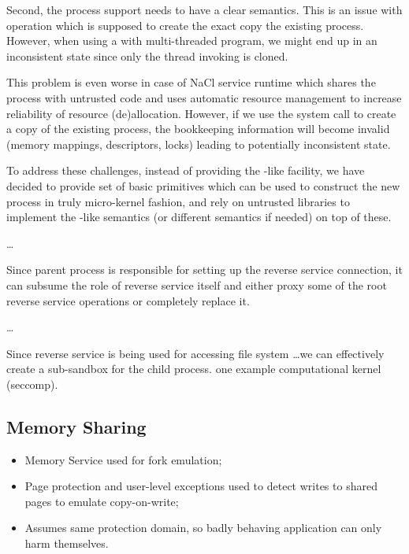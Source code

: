 Second, the process support needs to have a clear semantics. This is an
issue with  operation which is supposed to create the
exact copy the existing process. However, when using a 
with multi-threaded program, we might end up in an inconsistent state
since only the thread invoking  is cloned.

This problem is even worse in case of NaCl service runtime which shares
the process with untrusted code and uses automatic resource management
to increase reliability of resource (de)allocation. However, if we use
the  system call to create a copy of the existing process,
the bookkeeping information will become invalid (\eg memory mappings,
descriptors, locks) leading to potentially inconsistent state.

To address these challenges, instead of providing the
-like facility, we have decided to provide set of basic
primitives which can be used to construct the new process in truly
micro-kernel fashion, and rely on untrusted libraries to implement the
-like semantics (\eg or different semantics if needed) on
top of these.

\ldots

Since parent process is responsible for setting up the reverse service
connection, it can subsume the role of reverse service itself and either
proxy some of the root reverse service operations or completely replace
it.

\ldots

Since reverse service is being used for accessing file system \ldots we
can effectively create a sub-sandbox for the child process. one example
computational kernel (seccomp).

\subsection{Memory Sharing}
\label{sub:memory_sharing}

\begin{itemize}
\item Memory Service used for fork emulation;
\item Page protection and user-level exceptions used to detect
  writes to shared pages to emulate copy-on-write;
\item Assumes same protection domain, so badly behaving application
  can only harm themselves.
\end{itemize}

